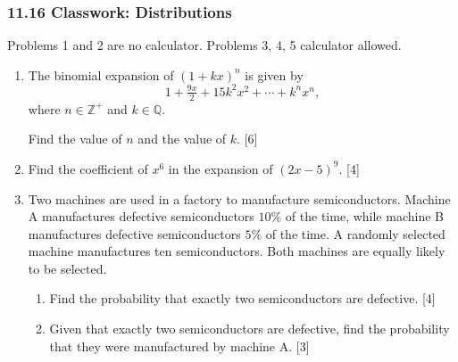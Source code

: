 \documentclass[12pt, twoside]{article}
\begin{document}
\subsubsection*{11.16 Classwork: Distributions}

Problems 1 and 2 are no calculator. Problems 3, 4, 5 calculator allowed.

\begin{enumerate}[itemsep=0.3cm]

\item The binomial expansion of $(1 + kx)^{n}$ is given by
      \[ 1 + \tfrac{9x}{2} + 15k^{2}x^{2} + \cdots + k^{n}x^{n}, \]
      where $n \in \mathbb{Z}^{+}$ and $k \in \mathbb{Q}$.

      Find the value of $n$ and the value of $k$. \hfill [6]


\item Find the coefficient of $x^{6}$ in the expansion of $(2x - 5)^{9}$. \hfill [4]


\newpage

\item Two machines are used in a factory to manufacture semiconductors.
      Machine A manufactures defective semiconductors $10\%$ of the time,
      while machine B manufactures defective semiconductors $5\%$ of the time.
      A randomly selected machine manufactures ten semiconductors.
      Both machines are equally likely to be selected.

      \begin{enumerate}[itemsep=0.1cm]
        \item Find the probability that exactly two semiconductors are defective. \hfill [4]
        \item Given that exactly two semiconductors are defective, find the
              probability that they were manufactured by machine A. \hfill [3]
      \end{enumerate}


\end{enumerate}
\end{document}
